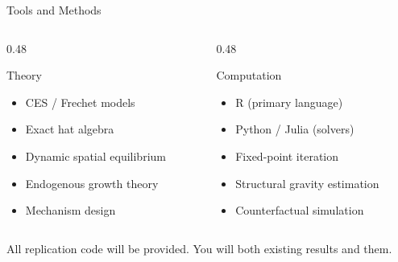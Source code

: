 \documentclass{beamer}
\begin{document}
\begin{frame}{Tools and Methods}

    \begin{columns}[T]
        \begin{column}{0.48\textwidth}
            \begin{block}{Theory}
                \begin{itemize}
                    \item CES / Frechet models
                    \item Exact hat algebra
                    \item Dynamic spatial equilibrium
                    \item Endogenous growth theory
                    \item Mechanism design
                \end{itemize}
            \end{block}
        \end{column}
        \begin{column}{0.48\textwidth}
            \begin{block}{Computation}
                \begin{itemize}
                    \item R (primary language)
                    \item Python / Julia (solvers)
                    \item Fixed-point iteration
                    \item Structural gravity estimation
                    \item Counterfactual simulation
                \end{itemize}
            \end{block}
        \end{column}
    \end{columns}

    \vspace{1em}
    All replication code will be provided. You will both  existing results and  them.

\end{frame}
\end{document}
